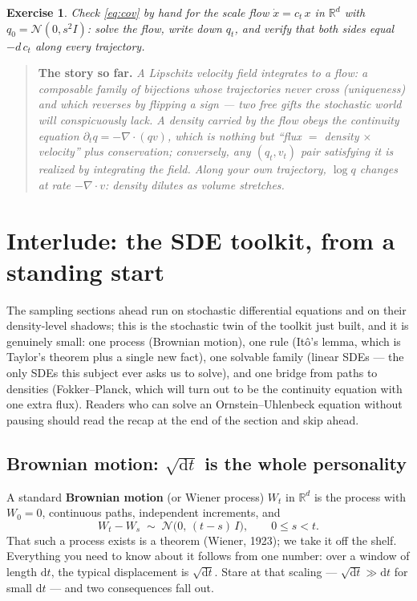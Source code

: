 \documentclass[10pt,a4paper]{article}
\newtheorem{exercise}{Exercise}
\newenvironment{recap}
{\par\medskip\noindent\begin{quote}\small\textbf{The story so far.}\itshape\;}
{\end{quote}\medskip}
\newcommand{\R}{\mathbb{R}}
\newcommand{\dd}{\mathrm{d}}
\begin{document}
\begin{exercise}
\label{ex:cov-check}
Check \eqref{eq:cov} by hand for the scale flow $\dot x = c_t\, x$ in
$\R^d$ with $q_0 = \mathcal{N}(0, s^2 I)$: solve the flow, write down
$q_t$, and verify that both sides equal $-d\, c_t$ along every
trajectory.
\end{exercise}

\begin{recap}
A Lipschitz velocity field integrates to a flow: a composable family of
bijections whose trajectories never cross (uniqueness) and which
reverses by flipping a sign --- two free gifts the stochastic world will
conspicuously lack. A density carried by the flow obeys the continuity
equation $\partial_t q = -\nabla\!\cdot\!(qv)$, which is nothing but
``flux $=$ density $\times$ velocity'' plus conservation; conversely,
any $(q_t, v_t)$ pair satisfying it is realized by integrating the
field. Along your own trajectory, $\log q$ changes at rate
$-\nabla\!\cdot\!v$: density dilutes as volume stretches.
\end{recap}

\section{Interlude: the SDE toolkit, from a standing start}
\label{sec:sde}

The sampling sections ahead run on stochastic differential equations
and on their density-level shadows; this is the stochastic twin of the
toolkit just built, and it is genuinely small: one process (Brownian
motion), one rule (It\^o's lemma, which is Taylor's theorem plus a
single new fact), one solvable family (linear SDEs --- the only SDEs
this subject ever asks us to solve), and one bridge from paths to
densities (Fokker--Planck, which will turn out to be the continuity
equation with one extra flux). Readers who can solve an
Ornstein--Uhlenbeck equation without pausing should read the recap at
the end of the section and skip ahead.

\subsection{Brownian motion: $\sqrt{\dd t}$ is the whole personality}
\label{sec:bm}

A standard \textbf{Brownian motion} (or Wiener process) $W_t$ in $\R^d$
is the process with $W_0 = 0$, continuous paths, independent increments,
and
\begin{equation}
W_t - W_s \;\sim\; \mathcal{N}\big(0,\, (t-s)\, I\big),
\qquad 0 \le s < t.
\end{equation}
That such a process exists is a theorem (Wiener, 1923); we take it off
the shelf. Everything you need to know about it follows from one number:
over a window of length $\dd t$, the typical displacement is
$\sqrt{\dd t}$. Stare at that scaling --- $\sqrt{\dd t} \gg \dd t$ for
small $\dd t$ --- and two consequences fall out.
\end{document}
